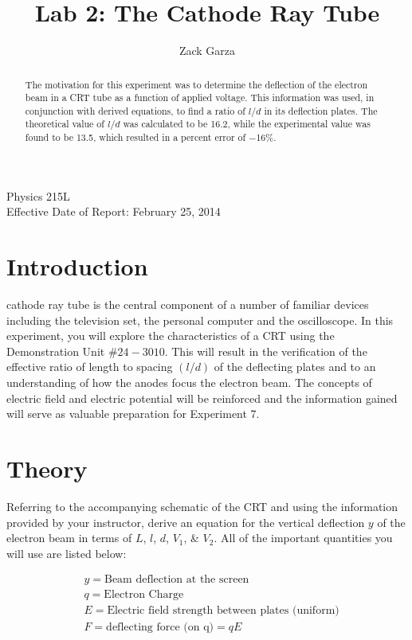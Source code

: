 \documentclass[twocolumn,english]{IEEEtran}
\theoremstyle{plain}
\theoremstyle{plain}
\begin{document}
\title{Lab 2: The Cathode Ray Tube}


\author{Zack Garza}


\IEEEspecialpapernotice
{Physics 215L \\
Effective Date of Report: February 25, 2014}


\maketitle
\begin{abstract}
The motivation for this experiment was to determine the deflection of the electron beam in a CRT tube as a function of applied voltage.
This information was used, in conjunction with derived equations, to find a ratio of $l/d$ in its deflection plates.
The theoretical value of $l/d$ was calculated to be \num{16.2}, while the experimental value was found to be \num{13.5}, which resulted in a percent error of \num{-16}\%.
\end{abstract}
\tableofcontents

\section{Introduction}



 cathode ray tube is the central component
of a number of familiar devices including the television set, the
personal computer and the oscilloscope.
In this experiment, you will
explore the characteristics of a CRT using the Demonstration Unit
$\#24-3010$.
This will result in the verification of the effective ratio
of length to spacing $(l/d)$ of the deflecting plates and to an understanding
of how the anodes focus the electron beam.
The concepts of electric field and electric potential will be reinforced and the information
gained will serve as valuable preparation for Experiment 7.

\section{Theory}
Referring to the accompanying schematic of the CRT and using the information provided by your instructor, derive an equation for the vertical deflection $y$ of the electron beam in terms of $L$, $l$, $d$, $V_1$, \& $V_2$.
All of the important quantities you will use are listed below:

\noindent
\begin{align*}
&y = \text{Beam deflection at the screen}\\
&q = \text{Electron Charge}\\
&E = \text{Electric field strength between plates (uniform)}\\
&F = \text{deflecting force (on q)} =qE\\
\end{align*}
\hrulefill \\
\end{document}
